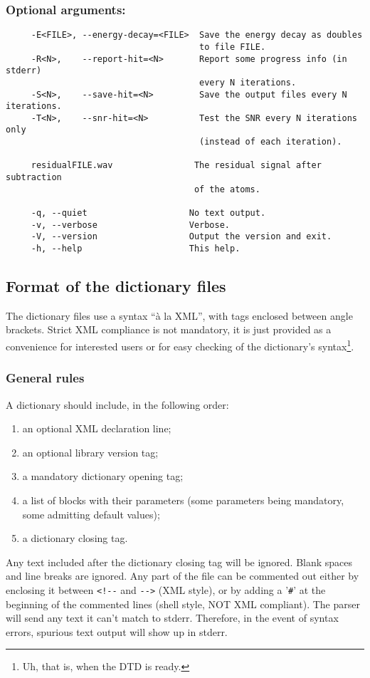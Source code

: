 \documentclass[11pt,a4paper]{article}
\begin{document}
\subsubsection*{Optional arguments:}
\begin{verbatim}
     -E<FILE>, --energy-decay=<FILE>  Save the energy decay as doubles
                                      to file FILE.
     -R<N>,    --report-hit=<N>       Report some progress info (in stderr)
                                      every N iterations.
     -S<N>,    --save-hit=<N>         Save the output files every N iterations.
     -T<N>,    --snr-hit=<N>          Test the SNR every N iterations only
                                      (instead of each iteration).

     residualFILE.wav                The residual signal after subtraction
                                     of the atoms.

     -q, --quiet                    No text output.
     -v, --verbose                  Verbose.
     -V, --version                  Output the version and exit.
     -h, --help                     This help.
\end{verbatim}



\clearpage
\subsection{Format of the dictionary files \label{dict_format}}
The dictionary files use a syntax ``\`a la XML'', with tags enclosed between
angle brackets. Strict XML compliance is not mandatory, it is just provided as
a convenience for interested users or for easy checking of the dictionary's
syntax\footnote{Uh, that is, when the DTD is ready.}.

\subsubsection*{General rules}
A dictionary should include, in the following order:
\begin{enumerate}
\item an optional XML declaration line;
\item an optional library version tag;
\item a mandatory dictionary opening tag;
\item a list of blocks with their parameters (some parameters being mandatory,
  some admitting default values);
\item a dictionary closing tag.
\end{enumerate}
Any text included after the dictionary closing tag will be ignored. Blank
spaces and line breaks are ignored. Any part of the file can be commented out
either by enclosing it between \verb+<!--+ and \verb+-->+ (XML style), or by
adding a '\verb+#+' at the beginning of the commented lines (shell style, NOT
XML compliant). The parser will send any text it can't match to stderr.
Therefore, in the event of syntax errors, spurious text output will show up in
stderr.
\end{document}
